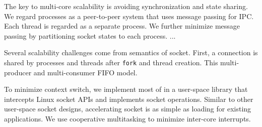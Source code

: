 The key to multi-core scalability is avoiding synchronization and state sharing. We regard processes as a peer-to-peer system that uses message passing for IPC. Each thread is regarded as a separate process. We further minimize message passing by partitioning socket states to each process. ...

Several scalability challenges come from semantics of socket. First, a connection is shared by processes and threads after \texttt{fork} and thread creation. This multi-producer and multi-consumer FIFO model. 

To minimize context switch, we implement most of \sys{} in a user-space library \libipc{} that intercepts Linux socket APIs and implements socket operations. Similar to other user-space socket designs, accelerating socket is as simple as loading \libipc{} for existing applications. We use cooperative multitasking to minimize inter-core interrupts.